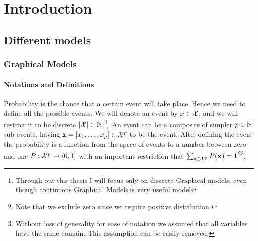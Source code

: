 
\chapter{Introduction} %

\label{intro} %


\newcommand{\keyword}[1]{\textbf{#1}}
\newcommand{\tabhead}[1]{\textbf{#1}}
\newcommand{\code}[1]{\texttt{#1}}
\newcommand{\file}[1]{\texttt{\bfseries#1}}
\newcommand{\option}[1]{\texttt{\itshape#1}}

\section{Different models}
\subsection{Graphical Models}
\subsubsection{Notations and Definitions}
Probability is the chance that a certain event will take place.
Hence we need to define all the possible events.
We will denote an event by $x \in {\cal X}$, and we will restrict it to be discrete $ |{\cal X}| \in \mathbb{N}$
\footnote{Through out this thesis I will focus only on discrete Graphical models, even though continuous Graphical Models is very useful model}.
An event can be a composite of simpler $p \in \mathbb{N}$ sub events, having ${\bf x} = [x_1, \ldots, x_{p}] \in {\cal X}^p$ to be the event.
After defining the event the probability is  a function from the space of events to a number between zero and one $P:{\cal X}^{p} \to (0,1]$ with an important restriction that $\sum_{{\bf x} \in {\cal X}^{p}} P({\bf x}) = 1$\footnote{Note that we exclude zero since we require positive distribution.}\footnote{Without loss of generality for ease of notation we assumed that all variables have the same domain. This assumption can be easily removed.}.

